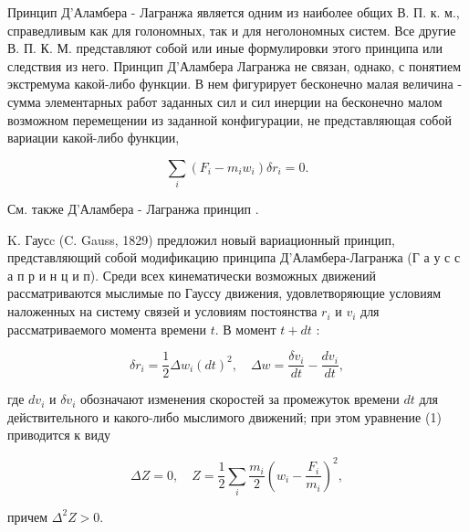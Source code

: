 \documentclass[10pt]{article}
\begin{document}
Принцип Д'Аламбера - Лагранжа является одним из наиболее общих В. П. к. м., справедливым как для голономных, так и для неголономных систем. Все другие В. П. К. М. представляют собой или иные формулировки этого принципа или следствия из него. Принцип Д’Аламбера Лагранжа не связан, однако, с понятием экстремума какой-либо функции. В нем фигурирует бесконечно малая величина - сумма элементарных работ заданных сил и сил инерции на бесконечно малом возможном перемещении из заданной конфигурации, не представляющая собой вариации какой-либо функции,



\[

\sum_{i}\left(F_{i}-m_{i} w_{i}\right) \delta r_{i}=0 .

\]



См. также Д'Аламбера - Лагранжа принцип .



K. Гаусc (C. Gauss, 1829) предложил новый вариационный принцип, представляющий собой модификацию принципа Д'Аламбера-Лагранжа (Г а у с с а п р и н ц и п). Среди всех кинематически возможных движений рассматриваются мыслимые по Гауссу движения, удовлетворяющие условиям наложенных на систему связей и условиям постоянства $r_{i}$ и $v_{i}$ для рассматриваемого момента времени $t$. В момент $t+d t$ :



\[

\delta r_{i}=\frac{1}{2} \Delta w_{i}(d t)^{2}, \quad \Delta w=\frac{\delta v_{i}}{d t}-\frac{d v_{i}}{d t},

\]



где $d v_{i}$ и $\delta v_{i}$ обозначают изменения скоростей за промежуток времени $d t$ для действительного и какого-либо мыслимого движений; при этом уравнение (1) приводится к виду



\[

\Delta Z=0, \quad Z=\frac{1}{2} \sum_{i} \frac{m_{i}}{2}\left(w_{i}-\frac{F_{i}}{m_{i}}\right)^{2},

\]



причем $\Delta^{2} Z>0$.
\end{document}
